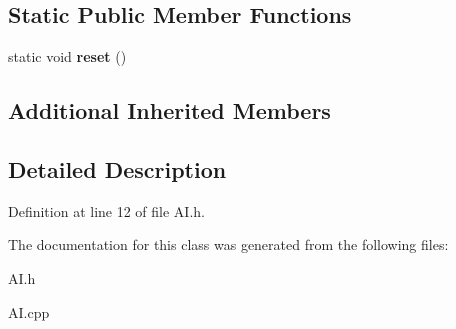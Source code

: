 \subsection*{Static Public Member Functions}
\begin{DoxyCompactItemize}
\item 
\hypertarget{class_a_i_a276d1e70117bd75efe1f16a87f8d8ed7}{}static void {\bfseries reset} ()\label{class_a_i_a276d1e70117bd75efe1f16a87f8d8ed7}

\end{DoxyCompactItemize}
\subsection*{Additional Inherited Members}


\subsection{Detailed Description}


Definition at line 12 of file A\+I.\+h.



The documentation for this class was generated from the following files\+:\begin{DoxyCompactItemize}
\item 
A\+I.\+h\item 
A\+I.\+cpp\end{DoxyCompactItemize}
